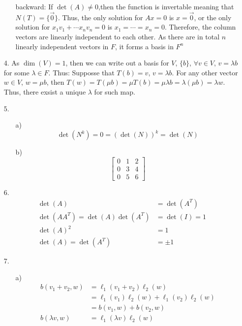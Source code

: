 \documentclass{article}
\begin{document}
\begin{itemize}
\begin{itemize}
        \item [backward:] If \(\det(A)\neq 0\),then the function is invertable meaning that \(N(T)=\{\overrightarrow{0}\}\). Thus, the only solution for \(Ax=0\) is \(x=\overrightarrow{0}\),
                or the only solution for \(x_1v_1+\cdots x_nv_n=0\) is \(x_1=\cdots=x_n=0\). Therefore, the column vectors are linearly independent to each other. As there are in total \(n\) linearly independent vectors in \(F\), it forms a basis in \(F^n\)
    \end{itemize}
    \item [4.]
    As \(\dim(V)=1\), then we can write out a basis for \(V\), \(\{b\}\), \(\forall v\in V\), \(v=\lambda b\) for some \(\lambda\in F\). Thus:
    Supposse that \(T(b)=v\), \(v = \lambda b\). For any other vector \(w\in V\), \(w = \mu b\), then \(T(w)=T(\mu b)=\mu T(b)= \mu \lambda b = \lambda (\mu b)=\lambda w\). Thus, there exsist a unique \(\lambda\) for such map.
    \item [5.]
    \begin{itemize}
        \item [a)] 
        \[\det(N^k)=0=\left(\det(N)\right)^k=\det(N)\]
        \item [b)]\[
        \begin{bmatrix}
            0&1&2\\
            0&3&4\\
            0&5&6
        \end{bmatrix}\]
    \end{itemize}
    \item [6.]
        \begin{align*}
            \det(A)&=\det(A^T)\\
            \det(AA^T)=\det(A)\det(A^T)&=\det(I)=1\\
            \det(A)^2&=1\\
            \det(A)=\det(A^T)&=\pm 1 
        \end{align*}
    \item [7.]
    \begin{itemize}
        \item [a)]
        \begin{align*}
            b(v_1+v_2,w)&=\ell_1(v_1+v_2)\ell_2(w)\\
            &=\ell_1(v_1)\ell_2(w)+\ell_1(v_2)\ell_2(w)\\
            &=b(v_1,w)+b(v_2,w)\\
            b(\lambda v,w)&=\ell_1(\lambda v)\ell_2(w)\\

\end{align*}
\end{itemize}
\end{itemize}
\end{document}
